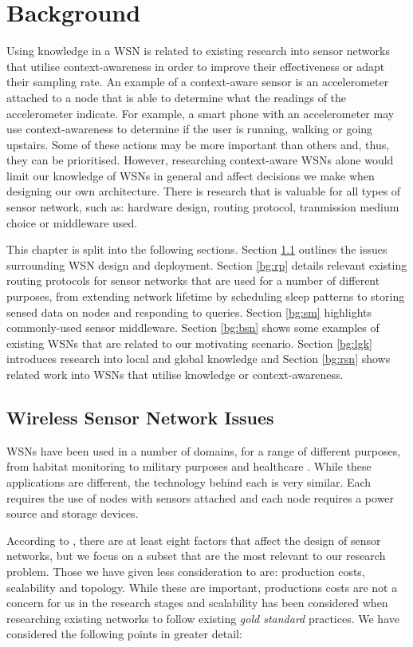 \chapter{Background}\label{chap:bg}
Using knowledge in a WSN is related to existing research into sensor networks that utilise context-awareness in order to improve their effectiveness or adapt their sampling rate. An example of a context-aware sensor is an accelerometer attached to a node that is able to determine what the readings of the accelerometer indicate. For example, a smart phone with an accelerometer may use context-awareness to determine if the user is running, walking or going upstairs. Some of these actions may be more important than others and, thus, they can be prioritised. However, researching context-aware WSNs alone would limit our knowledge of WSNs in general and affect decisions we make when designing our own architecture. There is research that is valuable for all types of sensor network, such as: hardware design, routing protocol, tranmission medium choice or middleware used.

This chapter is split into the following sections. Section \ref{bg:wsni} outlines the issues surrounding WSN design and deployment. 
Section \ref{bg:rp} details relevant existing routing protocols for sensor networks that are used for a number of different purposes, from extending network lifetime by scheduling sleep patterns to storing sensed data on nodes and responding to queries. Section \ref{bg:sm} highlights commonly-used sensor middleware. Section \ref{bg:bsn} shows some examples of existing WSNs that are related to our motivating scenario. Section \ref{bg:lgk} introduces research into local and global knowledge and Section \ref{bg:rsn} shows related work into WSNs that utilise knowledge or context-awareness.

\section{Wireless Sensor Network Issues} \label{bg:wsni}

WSNs have been used in a number of domains, for a range of different purposes, from habitat monitoring \cite{Szewczyk2004a} to military purposes \cite{Pizzocaro} and healthcare \cite{Otto2006}. While these applications are different, the technology behind each is very similar. Each requires the use of nodes with sensors attached and each node requires a power source and storage devices.

According to \cite{Akyildiz2002}, there are at least eight factors that affect the design of sensor networks, but we focus on a subset that are the most relevant to our research problem. Those we have given less consideration to are: production costs, scalability and topology. While these are important, productions costs are not a concern for us in the research stages and scalability has been considered when researching existing networks to follow existing \textit{gold standard} practices. We have considered the following points in greater detail:

